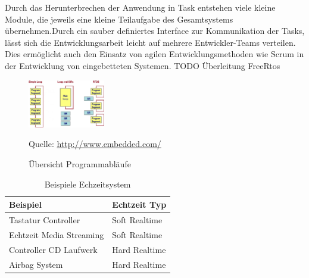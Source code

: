 \documentclass[ngerman]{seminarvorlage}
\newcommand*{\quelle}{%
  \footnotesize Quelle: 
}
\begin{document}
Durch das Herunterbrechen der Anwendung in Task entstehen viele kleine Module, die jeweils eine kleine Teilaufgabe des Gesamtsystems übernehmen.Durch ein sauber definiertes Interface zur Kommunikation der Tasks, lässt sich die Entwicklungsarbeit leicht auf mehrere Entwickler-Teams verteilen. Dies ermöglicht auch den Einsatz von agilen Entwicklungsmethoden wie Scrum in der Entwicklung von eingebetteten Systemen.  
\newline
TODO Überleitung FreeRtos
\newline  
\begin{figure}
	\centering
		\includegraphics[width=0.3\textwidth]{Pictures/EmbeddedCom/cwrtos2f5c.jpg}
	\caption{Übersicht Programmabläufe}
	\quelle\url{http://www.embedded.com/}
	\label{fig:Programmablauf}
\end{figure}

\begin{table}
	\centering
		\begin{tabular}{|l|l|}
		\hline
			   Beispiel & Echtzeit Typ \\
				\hline
  Tastatur Controller & Soft Realtime \\
	\hline
  Echtzeit Media Streaming  & Soft Realtime \\
	\hline
	Controller CD Laufwerk  & Hard Realtime \\
	\hline
	Airbag System  & Hard Realtime\\
	\hline
		\end{tabular}
	\caption{Beispiele Echzeitsystem}
	\label{tab:BeispieleEchzeitsystem}
\end{table}
\end{document}
